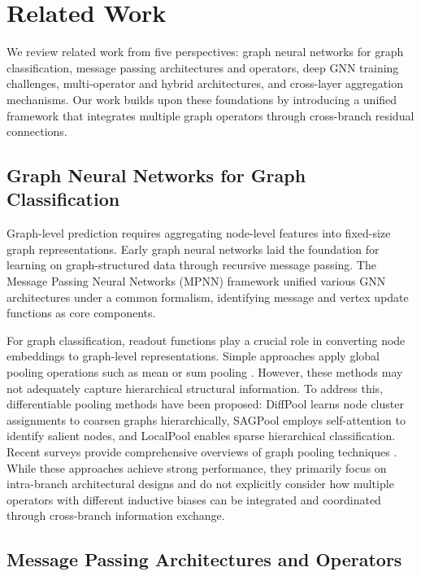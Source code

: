\section{Related Work}
\label{sec:related}

We review related work from five perspectives: graph neural networks for graph classification, message passing architectures and operators, deep GNN training challenges, multi-operator and hybrid architectures, and cross-layer aggregation mechanisms. Our work builds upon these foundations by introducing a unified framework that integrates multiple graph operators through cross-branch residual connections.

\subsection{Graph Neural Networks for Graph Classification}

Graph-level prediction requires aggregating node-level features into fixed-size graph representations. Early graph neural networks \cite{gori2005new} laid the foundation for learning on graph-structured data through recursive message passing. The Message Passing Neural Networks (MPNN) framework \cite{gilmer2017neural} unified various GNN architectures under a common formalism, identifying message and vertex update functions as core components.

For graph classification, readout functions play a crucial role in converting node embeddings to graph-level representations. Simple approaches apply global pooling operations such as mean or sum pooling \cite{duvenaud2015convolutional}. However, these methods may not adequately capture hierarchical structural information. To address this, differentiable pooling methods have been proposed: DiffPool \cite{ying2018hierarchical} learns node cluster assignments to coarsen graphs hierarchically, SAGPool \cite{lee2019self} employs self-attention to identify salient nodes, and LocalPool \cite{cangea2018towards} enables sparse hierarchical classification. Recent surveys provide comprehensive overviews of graph pooling techniques \cite{liu2022graph,li2024graph}. While these approaches achieve strong performance, they primarily focus on intra-branch architectural designs and do not explicitly consider how multiple operators with different inductive biases can be integrated and coordinated through cross-branch information exchange.

\subsection{Message Passing Architectures and Operators}

